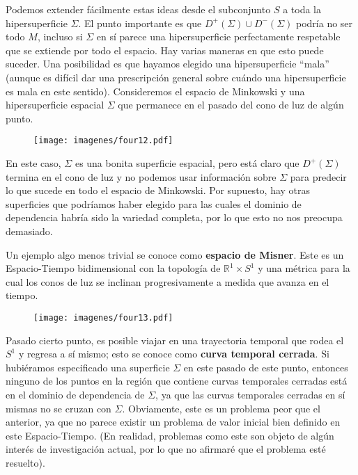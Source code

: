 \documentclass[11pt,b5paper,openany,twoside]{book}
\newcommand{\R}{\mathbb{R}}
\begin{document}
Podemos extender fácilmente estas ideas desde el subconjunto $S$ a toda la hipersuperficie $\Sigma$.
El punto importante es que $D^+(\Sigma)\cup D^-(\Sigma)$ podría no ser todo $M$, incluso si $\Sigma$ en sí parece una hipersuperficie perfectamente respetable que se extiende por todo el espacio.
Hay varias maneras en que esto puede suceder.
Una posibilidad es que hayamos elegido una hipersuperficie ``mala'' (aunque es difícil dar una prescripción general sobre cuándo una hipersuperficie es mala en este sentido).
Consideremos el espacio de Minkowski y una hipersuperficie espacial $\Sigma$ que permanece en el pasado del cono de luz de algún punto.

\begin{figure}[h]
\centering
\texttt{[image: imagenes/four12.pdf]}
\end{figure}

\noindent
En este caso, $\Sigma$ es una bonita superficie espacial, pero está claro que $D^+(\Sigma)$ termina en el cono de luz y no podemos usar información sobre $\Sigma$ para predecir lo que sucede en todo el espacio de Minkowski.
Por supuesto, hay otras superficies que podríamos haber elegido para las cuales el dominio de dependencia habría sido la variedad completa, por lo que esto no nos preocupa demasiado.

Un ejemplo algo menos trivial se conoce como {\bf espacio de Misner}.
Este es un Espacio-Tiempo bidimensional con la topología de $\R^1\times S^1$ y una métrica para la cual los conos de luz se inclinan progresivamente a medida que avanza en el tiempo.

\begin{figure}[h]
\centering
\texttt{[image: imagenes/four13.pdf]}
\end{figure}
Pasado cierto punto, es posible viajar en una trayectoria temporal que rodea el $S^1$ y regresa a sí mismo; esto se conoce como {\bf curva temporal cerrada}.
Si hubiéramos especificado una superficie $\Sigma$ en este pasado de este punto, entonces ninguno de los puntos en la región que contiene curvas temporales cerradas está en el dominio de dependencia de $\Sigma$, ya que las curvas temporales cerradas en sí mismas no se cruzan con $\Sigma$.
Obviamente, este es un problema peor que el anterior, ya que no parece existir un problema de valor inicial bien definido en este Espacio-Tiempo.
(En realidad, problemas como este son objeto de algún interés de investigación actual, por lo que no afirmaré que el problema esté resuelto).
\end{document}
